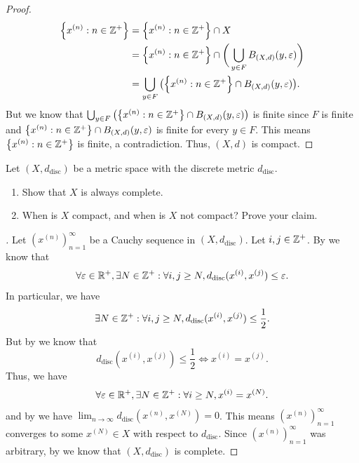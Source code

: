 \begin{proof}
\begin{align*}
    \set{x^{(n)} : n \in \Z^+} & = \set{x^{(n)} : n \in \Z^+} \cap X                                                        \\
                               & = \set{x^{(n)} : n \in \Z^+} \cap \bigg(\bigcup_{y \in F} B_{(X, d)}(y, \varepsilon)\bigg) \\
                               & = \bigcup_{y \in F} \big(\set{x^{(n)} : n \in \Z^+} \cap B_{(X, d)}(y, \varepsilon)\big).
  \end{align*}
  But we know that \(\bigcup_{y \in F} \big(\set{x^{(n)} : n \in \Z^+} \cap B_{(X, d)}(y, \varepsilon)\big)\) is finite since \(F\) is finite and \(\left\lbrace x^{(n)} : n \in \mathbb{Z}^+\right\rbrace \cap B_{(X, d)}(y, \varepsilon)\) is finite for every \(y \in F\).
  This means \(\left\lbrace x^{(n)} : n \in \mathbb{Z}^+\right\rbrace\) is finite, a contradiction.
  Thus, \((X, d)\) is compact.
\end{proof}

\begin{ex}\label{ii:ex:1.5.12}
  Let \((X, d_{\text{disc}})\) be a metric space with the discrete metric \(d_{\text{disc}}\).
  \begin{enumerate}
    \item\label{ii:ex:1.5.12.a} Show that \(X\) is always complete.
    \item\label{ii:ex:1.5.12.b} When is \(X\) compact, and when is \(X\) not compact?
    Prove your claim.
  \end{enumerate}
\end{ex}

\begin{proof}[]
  Let \((x^{(n)})_{n = 1}^\infty\) be a Cauchy sequence in \((X, d_{\text{disc}})\).
  Let \(i, j \in \mathbb{Z}^+\).
  By  we know that
  \[
    \forall \varepsilon \in \mathbb{R}^+, \exists N \in \mathbb{Z}^+ : \forall i, j \geq N, d_{\text{disc}}(x^{(i)}, x^{(j)}) \leq \varepsilon.
  \]
  In particular, we have
  \[
    \exists N \in \mathbb{Z}^+ : \forall i, j \geq N, d_{\text{disc}}(x^{(i)}, x^{(j)}) \leq \dfrac{1}{2}.
  \]
  But by  we know that
  \[
    d_{\text{disc}}(x^{(i)}, x^{(j)}) \leq \dfrac{1}{2} \iff x^{(i)} = x^{(j)}.
  \]
  Thus, we have
  \[
    \forall \varepsilon \in \mathbb{R}^+, \exists N \in \mathbb{Z}^+ : \forall i \geq N, x^{(i)} = x^{(N)}.
  \]
  and by  we have \(\lim_{n \to \infty} d_{\text{disc}}(x^{(n)}, x^{(N)}) = 0\).
  This means \((x^{(n)})_{n = 1}^\infty\) converges to some \(x^{(N)} \in X\) with respect to \(d_{\text{disc}}\).
  Since \((x^{(n)})_{n = 1}^\infty\) was arbitrary, by  we know that \((X, d_{\text{disc}})\) is complete.
\end{proof}

